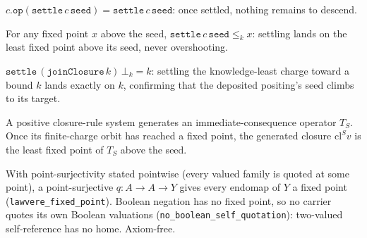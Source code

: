 \begin{theorem}\label{thm:settle-fixed}\leanok{}
$c.\texttt{op}(\texttt{settle}\,c\,\texttt{seed}) = \texttt{settle}\,c\,\texttt{seed}$:
once settled, nothing remains to descend.
\end{theorem}
\begin{theorem}\label{thm:settle-least}\leanok{}
For any fixed point $x$ above the seed, $\texttt{settle}\,c\,\texttt{seed} \le_k x$:
settling lands on the least fixed point above its seed, never overshooting.
\end{theorem}
\begin{theorem}\label{thm:settle-kbot}\leanok{}
$\texttt{settle}\,(\texttt{joinClosure}\,k)\,\bot_k = k$: settling the
knowledge-least charge toward a bound $k$ lands exactly on $k$, confirming that
the deposited positing's seed climbs to its target.
\end{theorem}

\begin{theorem}\label{thm:closure-rule-lfp}\leanok{}
A positive closure-rule system generates an immediate-consequence operator
$T_S$. Once its finite-charge orbit has reached a fixed point, the generated
closure $\mathrm{cl}^S v$ is the least fixed point of $T_S$ above the seed.
\end{theorem}

\begin{theorem}\label{thm:lawvere-diagonal}\leanok{}
With point-surjectivity stated pointwise (every valued family is quoted at
some point), a point-surjective $q : A \to A \to Y$ gives every endomap of
$Y$ a fixed point (\texttt{lawvere\_fixed\_point}). Boolean negation has no
fixed point, so no carrier quotes its own Boolean valuations
(\texttt{no\_boolean\_self\_quotation}): two-valued self-reference has no
home. Axiom-free.
\end{theorem}

